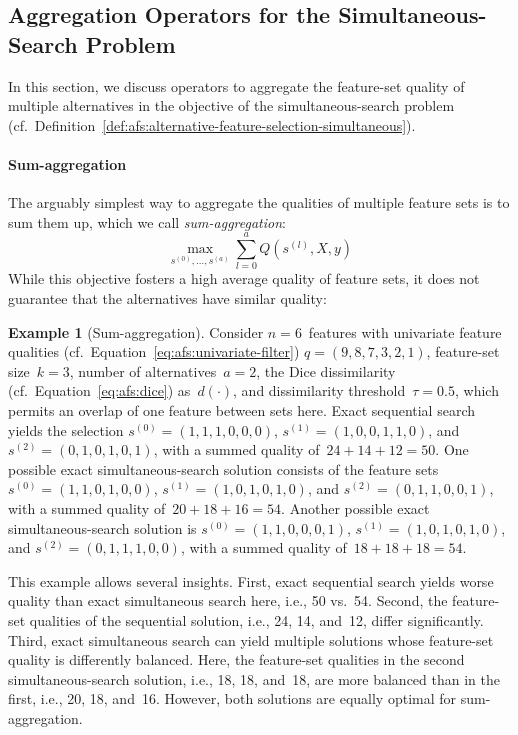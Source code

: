 \documentclass{article}
\theoremstyle{definition}
\newtheorem{example}{Example}
\begin{document}
\subsection{Aggregation Operators for the Simultaneous-Search Problem}
\label{sec:afs:appendix:simultaneous-objective-aggregation}

In this section, we discuss operators to aggregate the feature-set quality of multiple alternatives in the objective of the simultaneous-search problem (cf.~Definition~\ref{def:afs:alternative-feature-selection-simultaneous}).

\paragraph{Sum-aggregation}

The arguably simplest way to aggregate the qualities of multiple feature sets is to sum them up, which we call \emph{sum-aggregation}:
%
\begin{equation}
	\max_{s^{(0)}, \dots, s^{(a)}} \sum_{l=0}^a Q(s^{(l)},X,y)
	\label{eq:afs:afs-simultaneous-sum-objective}
\end{equation}
%
While this objective fosters a high average quality of feature sets, it does not guarantee that the alternatives have similar quality:
%
\begin{example}[Sum-aggregation]
Consider $n=6$~features with univariate feature qualities (cf.~Equation~\ref{eq:afs:univariate-filter}) $q = (9,8,7,3,2,1)$, feature-set size~$k=3$, number of alternatives~$a=2$, the Dice dissimilarity (cf.~Equation~\ref{eq:afs:dice}) as~$d(\cdot)$, and dissimilarity threshold~$\tau = 0.5$, which permits an overlap of one feature between sets here.
Exact sequential search yields the selection $s^{(0)} = (1,1,1,0,0,0)$, $s^{(1)} = (1,0,0,1,1,0)$, and $s^{(2)} = (0,1,0,1,0,1)$, with a summed quality of $\,24+14+12=50$.
One possible exact simultaneous-search solution consists of the feature sets $s^{(0)} = (1,1,0,1,0,0)$, $s^{(1)} = (1,0,1,0,1,0)$, and $s^{(2)} = (0,1,1,0,0,1)$, with a summed quality of $\,20+18+16=54$.
Another possible exact simultaneous-search solution is $s^{(0)} = (1,1,0,0,0,1)$, $s^{(1)} = (1,0,1,0,1,0)$, and $s^{(2)} = (0,1,1,1,0,0)$, with a summed quality of $\,18+18+18=54$.
\label{ex:afs:sum-aggregation}
\end{example}
%
This example allows several insights.
First, exact sequential search yields worse quality than exact simultaneous search here, i.e., 50 vs.~54.
Second, the feature-set qualities of the sequential solution, i.e., 24, 14, and~12, differ significantly.
Third, exact simultaneous search can yield multiple solutions whose feature-set quality is differently balanced.
Here, the feature-set qualities in the second simultaneous-search solution, i.e., 18, 18, and~18, are more balanced than in the first, i.e., 20, 18, and~16.
However, both solutions are equally optimal for sum-aggregation.
\end{document}
